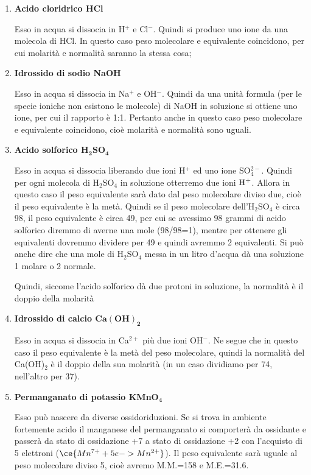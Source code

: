 \begin{enumerate}
    \item \textbf{Acido cloridrico HCl}
    
    Esso in acqua si dissocia in H$^+$ e Cl$^-$. Quindi si produce uno ione da una molecola di HCl. In questo caso peso molecolare e equivalente coincidono, per cui molarità e normalità saranno la stessa cosa;
    \item \textbf{Idrossido di sodio NaOH}
    
    Esso in acqua si dissocia in Na$^+$ e OH$^-$. Quindi da una unità formula (per le specie ioniche non esistono le molecole) di NaOH in soluzione si ottiene uno ione, per cui il rapporto è 1:1. Pertanto anche in questo caso peso molecolare e equivalente coincidono, cioè molarità e normalità sono uguali.
    \item \textbf{Acido solforico $\mathbf{H_2SO_4}$}
    
    Esso in acqua si dissocia liberando due ioni H$^+$ ed uno ione SO$_4^{2-}$. Quindi per ogni molecola di H$_2$SO$_4$ in soluzione otterremo due ioni $\rm H^+$. Allora in questo caso il peso equivalente sarà dato dal peso molecolare diviso due, cioè il peso equivalente è la metà. Quindi se il peso molecolare dell'H$_2$SO$_4$ è circa 98, il peso equivalente è circa 49, per cui se avessimo 98 grammi di acido solforico diremmo di averne una mole (98/98=1), mentre per ottenere gli equivalenti dovremmo dividere per 49 e quindi avremmo 2 equivalenti. Si può anche dire che una mole di H$_2$SO$_4$ messa in un litro d'acqua dà una soluzione 1 molare o 2 normale.

    Quindi, siccome l'acido solforico dà due protoni in soluzione, la normalità è il doppio della molarità
    \item \textbf{Idrossido di calcio $\mathbf{Ca(OH)_2}$}
    
    Esso in acqua si dissocia in Ca$^{2+}$ più due ioni OH$^-$. Ne segue che in questo caso il peso equivalente è la metà del peso molecolare, quindi la normalità del Ca(OH)$_2$ è il doppio della sua molarità (in un caso dividiamo per 74, nell'altro per 37).
    \item \textbf{Permanganato di potassio KMnO$_{\boldsymbol{4}}$}
    
    Esso può nascere da diverse ossidoriduzioni. Se si trova in ambiente fortemente acido il manganese del permanganato si comporterà da ossidante e passerà da stato di ossidazione +7 a stato di ossidazione +2 con l'acquisto di 5 elettroni ($\ce{Mn^{7+} + 5e -> Mn^{2+}}$). Il peso equivalente sarà uguale al peso molecolare diviso 5, cioè avremo M.M.=158 e M.E.=31.6.


\end{enumerate}
